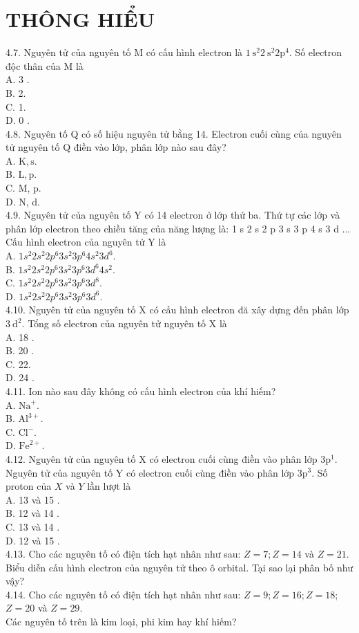 \documentclass[10pt]{article}
\begin{document}
\section*{THÔNG HIỂU}
4.7. Nguyên tử của nguyên tố M có cấu hình electron là $1 \mathrm{~s}^{2} 2 \mathrm{~s}^{2} 2 \mathrm{p}^{4}$. Số electron độc thân của M là\\
A. 3 .\\
B. 2.\\
C. 1.\\
D. 0 .\\
4.8. Nguyên tố Q có số hiệu nguyên tử bằng 14. Electron cuối cùng của nguyên tử nguyên tố Q điền vào lớp, phân lớp nào sau đây?\\
A. $\mathrm{K}, \mathrm{s}$.\\
B. $\mathrm{L}, \mathrm{p}$.\\
C. M, p.\\
D. N, d.\\
4.9. Nguyên tử của nguyên tố Y có 14 electron ở lớp thứ ba. Thứ tự các lớp và phân lớp electron theo chiều tăng của năng lượng là: 1 s 2 s 2 p 3 s 3 p 4 s 3 d ... Cấu hình electron của nguyên tử Y là\\
A. $1 s^{2} 2 s^{2} 2 p^{6} 3 s^{2} 3 p^{6} 4 s^{2} 3 d^{6}$.\\
B. $1 s^{2} 2 s^{2} 2 p^{6} 3 s^{2} 3 p^{6} 3 d^{6} 4 s^{2}$.\\
C. $1 s^{2} 2 s^{2} 2 p^{6} 3 s^{2} 3 p^{6} 3 d^{8}$.\\
D. $1 s^{2} 2 s^{2} 2 p^{6} 3 s^{2} 3 p^{6} 3 d^{6}$.\\
4.10. Nguyên tử của nguyên tố X có cấu hình electron đă xây dựng đến phân lớp $3 \mathrm{~d}^{2}$. Tổng số electron của nguyên tử nguyên tố X là\\
A. 18 .\\
B. 20 .\\
C. 22.\\
D. 24 .\\
4.11. Ion nào sau đây không có cấu hình electron của khí hiếm?\\
A. $\mathrm{Na}^{+}$.\\
B. $\mathrm{Al}^{3+}$.\\
C. $\mathrm{Cl}^{-}$.\\
D. $\mathrm{Fe}^{2+}$.\\
4.12. Nguyên tử của nguyên tố X có electron cuối cùng điền vào phân lớp $3 \mathrm{p}^{1}$. Nguyên tử của nguyên tố Y có electron cuối cùng điền vào phân lớp $3 \mathrm{p}^{3}$. Số proton của $X$ và $Y$ lần lượt là\\
A. 13 và 15 .\\
B. 12 và 14 .\\
C. 13 và 14 .\\
D. 12 và 15 .\\
4.13. Cho các nguyên tố có điện tích hạt nhân như sau: $Z=7 ; Z=14$ và $Z=21$. Biểu diễn cấu hình electron của nguyên tử theo ô orbital. Tại sao lại phân bố như vậy?\\
4.14. Cho các nguyên tố có điện tích hạt nhân như sau: $Z=9 ; Z=16 ; Z=18$; $Z=20$ và $Z=29$.\\
Các nguyên tố trên là kim loại, phi kim hay khí hiếm?
\end{document}
